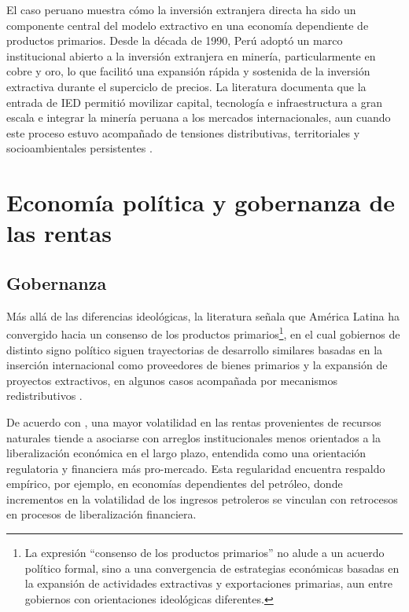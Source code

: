 \documentclass[../../PTFM.tex]{subfiles}
\begin{document}
	El caso peruano muestra cómo la inversión extranjera directa ha sido un componente central del modelo extractivo en una economía dependiente de productos primarios. Desde la década de 1990, Perú adoptó un marco institucional abierto a la inversión extranjera en minería, particularmente en cobre y oro, lo que facilitó una expansión rápida y sostenida de la inversión extractiva durante el superciclo de precios. La literatura documenta que la entrada de IED permitió movilizar capital, tecnología e infraestructura a gran escala e integrar la minería peruana a los mercados internacionales, aun cuando este proceso estuvo acompañado de tensiones distributivas, territoriales y socioambientales persistentes \parencite{Bebbington2013}.
	
	\section{Economía política y gobernanza de las rentas}
	\label{sec:economia-politica}
	
	\subsection{Gobernanza}
	\label{subsec:gobernanza}
	
	Más allá de las diferencias ideológicas, la literatura señala que América Latina ha convergido hacia un consenso de los productos primarios\footnote{La expresión ``consenso de los productos primarios'' no alude a un acuerdo político formal, sino a una convergencia de estrategias económicas basadas en la expansión de actividades extractivas y exportaciones primarias, aun entre gobiernos con orientaciones ideológicas diferentes.}, en el cual gobiernos de distinto signo político siguen trayectorias de desarrollo similares basadas en la inserción internacional como proveedores de bienes primarios y la expansión de proyectos extractivos, en algunos casos acompañada por mecanismos redistributivos \parencite{Svampa2013}.
	
	De acuerdo con \textcite{Boucekkine2021}, una mayor volatilidad en las rentas provenientes de recursos naturales tiende a asociarse con arreglos institucionales menos orientados a la liberalización económica en el largo plazo, entendida como una orientación regulatoria y financiera más pro-mercado. Esta regularidad encuentra respaldo empírico, por ejemplo, en economías dependientes del petróleo, donde incrementos en la volatilidad de los ingresos petroleros se vinculan con retrocesos en procesos de liberalización financiera.
	
\end{document}

